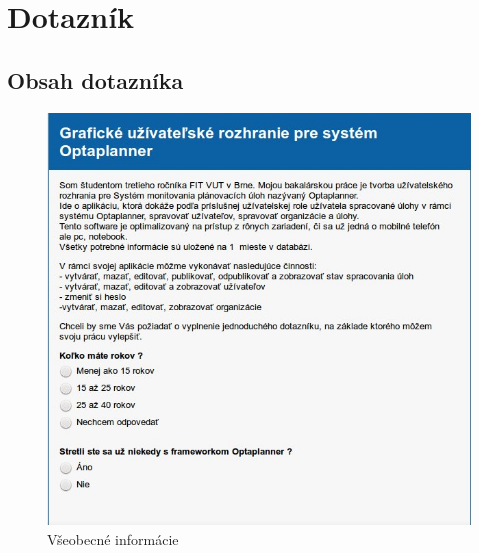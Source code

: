 \chapter{Dotazník}
{
	\section{Obsah dotazníka}
	{
\begin{figure}[htb]

\begin{center}

\includegraphics[scale=0.5]{dotaz.jpg} 
\caption{Všeobecné informácie}


\end{center}

\end{figure}


\begin{figure}[htb]

\begin{center}


\end{center}
\end{figure}}}
